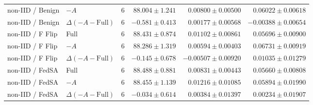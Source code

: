 \begin{table}[t]
\begin{tabular}{llrrrr}
non-IID / Benign & $-A$ & 6 & $88.004 \pm 1.241$ & $0.00800 \pm 0.00500$ & $0.06022 \pm 0.00618$ \\
non-IID / Benign & $\Delta(-A-\mathrm{Full})$ & 6 & $-0.581 \pm 0.413$ & $0.00177 \pm 0.00568$ & $-0.00388 \pm 0.00654$ \\
non-IID / F Flip & Full & 6 & $88.431 \pm 0.874$ & $0.01102 \pm 0.00861$ & $0.05696 \pm 0.00900$ \\
non-IID / F Flip & $-A$ & 6 & $88.286 \pm 1.319$ & $0.00594 \pm 0.00403$ & $0.06731 \pm 0.00919$ \\
non-IID / F Flip & $\Delta(-A-\mathrm{Full})$ & 6 & $-0.145 \pm 0.678$ & $-0.00507 \pm 0.00920$ & $0.01035 \pm 0.01279$ \\
non-IID / FedSA & Full & 6 & $88.488 \pm 0.881$ & $0.00831 \pm 0.00443$ & $0.05660 \pm 0.00808$ \\
non-IID / FedSA & $-A$ & 6 & $88.455 \pm 1.139$ & $0.01216 \pm 0.01085$ & $0.05894 \pm 0.01990$ \\
non-IID / FedSA & $\Delta(-A-\mathrm{Full})$ & 6 & $-0.034 \pm 0.614$ & $0.00384 \pm 0.01397$ & $0.00234 \pm 0.01907$ \\
\bottomrule
\end{tabular}
\end{table}

